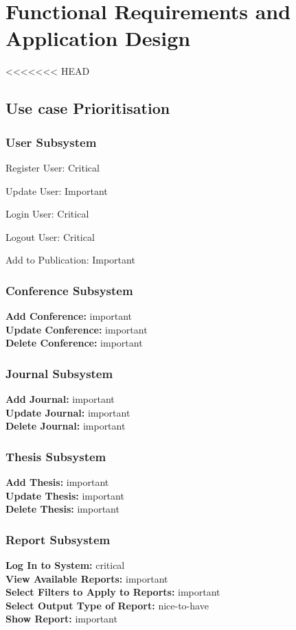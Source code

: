 \documentclass{article}
\begin{document}
	\section{Functional Requirements and Application Design}
<<<<<<< HEAD
		\subsection{Use case Prioritisation}
			\subsubsection{User Subsystem}
				Register User: Critical\par
				Update User: Important\par
				Login User: Critical\par
				Logout User: Critical\par
				Add to Publication: Important
			\subsubsection{Conference Subsystem}
				\textbf{Add Conference:} important\\
				\textbf{Update Conference:} important\\
				\textbf{Delete Conference:} important
			\subsubsection{Journal Subsystem}
				\textbf{Add Journal:} important\\
				\textbf{Update Journal:} important\\
				\textbf{Delete Journal:} important
			\subsubsection{Thesis Subsystem}
				\textbf{Add Thesis:} important\\
				\textbf{Update Thesis:} important\\
				\textbf{Delete Thesis:} important
			\subsubsection{Report Subsystem}
				\textbf{Log In to System:} critical\\
				\textbf{View Available Reports:} important\\
				\textbf{Select Filters to Apply to Reports:} important\\
				\textbf{Select Output Type of Report:} nice-to-have\\
				\textbf{Show Report:} important\\
\end{document}
